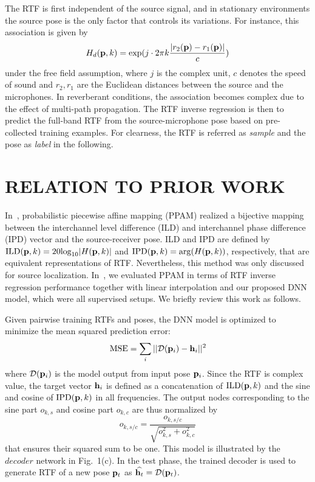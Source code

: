 \documentclass{article}
\begin{document}
The RTF is first independent of the source signal, and in stationary environments the source pose is the only factor that controls its variations. For instance, this association is given by
\begin{equation}\label{eq:green}
  H_d({\bf p},k)={\text{exp}(j\cdot 2\pi k \frac{|r_2({\bf p}) - r_1({\bf p})|}{c})}
\end{equation}
under the free field assumption, where $j$ is the complex unit, $c$ denotes the speed of sound and $r_{2}, r_{1}$ are the Euclidean distances between the source and the microphones. In reverberant conditions, the association becomes complex due to the effect of multi-path propagation. The RTF inverse regression is then to predict the full-band RTF from the source-microphone pose based on pre-collected training examples. For clearness, the RTF is referred as \emph{sample} and the pose as \emph{label} in the following.


\section{RELATION TO PRIOR WORK}

In~\cite{deleforge2015acoustic}, probabilistic piecewise affine mapping (PPAM) realized a bijective mapping between the interchannel level difference (ILD) and interchannel phase difference (IPD) vector and the source-receiver pose. ILD and IPD are defined by $\text{ILD}({\bf p}, k)=20{\rm log}_{10}|H({\bf p}, k)|$ and $\text{IPD}({\bf p}, k)={\rm arg}(H({\bf p}, k))$, respectively, that are equivalent representations of RTF. Nevertheless, this method was only discussed for source localization. In~\cite{rtfinv2017}, we evaluated PPAM in terms of RTF inverse regression performance together with linear interpolation and our proposed DNN model, which were all supervised setups. We briefly review this work as follows.

Given pairwise training RTFs and poses, the DNN model is optimized to minimize the mean squared prediction error:
\begin{equation}\label{eq:Dmmse}
  \text{MSE} = \sum_{i}||\mathcal{D}({\bf p}_i) - {\bf h}_i||^2
\end{equation}
where $\mathcal{D}({\bf p}_i)$ is the model output from input pose ${\bf p}_i$. Since the RTF is complex value, the target vector ${\bf h}_i$ is defined as a concatenation of $\text{ILD}({\bf p}, k)$ and the sine and cosine of $\text{IPD}({\bf p}, k)$ in all frequencies. The output nodes corresponding to the sine part $o_{k,s}$ and cosine part $o_{k,c}$ are thus normalized by
\begin{equation}\label{eq:ln}
  o_{k,s/c}=\frac{o_{k,s/c}}{\sqrt{o_{k,s}^2+o_{k,c}^2}}
\end{equation}
that ensures their squared sum to be one. This model is illustrated by the $decoder$ network in Fig.~1(c). In the test phase, the trained decoder is used to generate RTF of a new pose ${\bf p}_t$ as $\widehat{{\bf h}_t}=\mathcal{D}({\bf p}_t)$.
\end{document}
